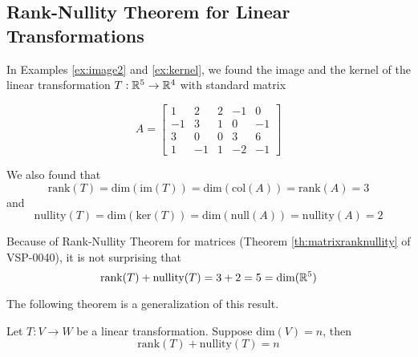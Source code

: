 \documentclass{ximera}
\begin{document}
\subsection*{Rank-Nullity Theorem for Linear Transformations}

In Examples \ref{ex:image2} and \ref{ex:kernel}, we found the image and the kernel of the linear transformation $T:\mathbb{R}^5\rightarrow \mathbb{R}^4$ with standard matrix

$$A=\begin{bmatrix}1 & 2 & 2 &-1 & 0\\-1 & 3 & 1 & 0 & -1\\3 & 0 & 0 & 3 & 6\\ 1 & -1 & 1 & -2 & -1\end{bmatrix}$$

We also found that
$$\mbox{rank}(T)=\mbox{dim}(\mbox{im}(T))=\mbox{dim}(\mbox{col}(A))=\mbox{rank}(A)=3$$
and
$$\mbox{nullity}(T)=\mbox{dim}(\mbox{ker}(T))=\mbox{dim}(\mbox{null}(A))=\mbox{nullity}(A)=2$$

Because of Rank-Nullity Theorem for matrices (Theorem \ref{th:matrixranknullity} of VSP-0040), it is not surprising that 
$$\mbox{rank}(T)+\mbox{nullity}(T)=3+2=5=\mbox{dim}(\mathbb{R}^5)$$


The following theorem is a generalization of this result.

\begin{theorem}
Let $T:V\rightarrow W$ be a linear transformation.  Suppose $\mbox{dim}(V)=n$, then
$$\mbox{rank}(T)+\mbox{nullity}(T)=n$$
\end{theorem}
\end{document}

